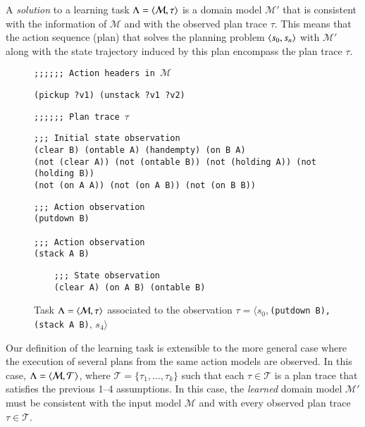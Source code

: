 A {\em solution} to a learning task $\Lambda={\langle \mathcal{M},\tau \rangle}$ is a domain model $\mathcal{M}'$ that is consistent with the information of $\mathcal{M}$ and with the observed plan trace $\tau$. This means that the action sequence (plan) that solves the planning problem ${\langle s_0,s_n \rangle}$ with $\mathcal{M}'$ along with the state trajectory induced by this plan encompass the plan trace $\tau$.

\begin{figure}[hbt!]
{\footnotesize\tt ;;;;;; Action headers in $\mathcal{M}$}
\begin{footnotesize}
\begin{verbatim}
(pickup ?v1) (unstack ?v1 ?v2)
\end{verbatim}
\end{footnotesize}
\vspace{0.2cm}
{\footnotesize\tt ;;;;;; Plan trace $\tau$}
\begin{footnotesize}
\begin{verbatim}
;;; Initial state observation
(clear B) (ontable A) (handempty) (on B A)
(not (clear A)) (not (ontable B)) (not (holding A)) (not (holding B))
(not (on A A)) (not (on A B)) (not (on B B))
\end{verbatim}
\end{footnotesize}

\begin{footnotesize}
\begin{verbatim}
;;; Action observation
(putdown B)

;;; Action observation
(stack A B)
\end{verbatim}
\end{footnotesize}

\begin{footnotesize}
	\begin{verbatim}
	;;; State observation
	(clear A) (on A B) (ontable B)
	\end{verbatim}
\end{footnotesize}

 \caption{\small Task $\Lambda={\langle \mathcal{M},\tau \rangle}$ associated to the observation $\tau=\langle s_0,${\small\tt (putdown\ B),(stack\ A\ B)}, $s_4\rangle$}
\label{fig:example-plans}
\end{figure}

Our definition of the learning task is extensible to the more general case where the execution of several plans from the same action models are observed. In this case, $\Lambda={\langle \mathcal{M},\mathcal{T} \rangle}$, where $\mathcal{T}=\{\tau_1,\ldots,\tau_{k}\}$ such that each $\tau\in \mathcal{T}$ is a plan trace that satisfies the previous 1--4 assumptions. In this case, the {\em learned} domain model $\mathcal{M}'$ must be consistent with the input model $\mathcal{M}$ and with every observed plan trace $\tau\in \mathcal{T}$.


